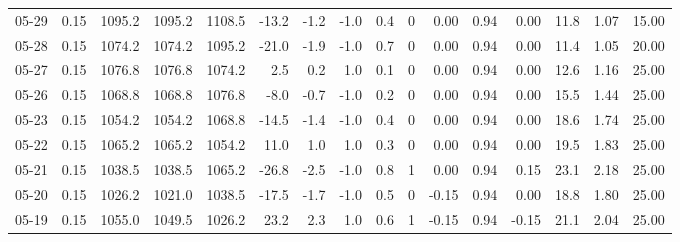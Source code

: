 \begin{threeparttable}
{\begin{tabular}{lrrrrrrrrrrrrrrr}
  05-29 &     0.15 & 1095.2 & 1095.2 & 1108.5 &      -13.2 &           -1.2 &                     -1.0 &                 0.4 &              0 &       0.00 &      0.94 &           0.00 &             11.8 &            1.07 &                  15.00 \\
  05-28 &     0.15 & 1074.2 & 1074.2 & 1095.2 &      -21.0 &           -1.9 &                     -1.0 &                 0.7 &              0 &       0.00 &      0.94 &           0.00 &             11.4 &            1.05 &                  20.00 \\
  05-27 &     0.15 & 1076.8 & 1076.8 & 1074.2 &        2.5 &            0.2 &                      1.0 &                 0.1 &              0 &       0.00 &      0.94 &           0.00 &             12.6 &            1.16 &                  25.00 \\
  05-26 &     0.15 & 1068.8 & 1068.8 & 1076.8 &       -8.0 &           -0.7 &                     -1.0 &                 0.2 &              0 &       0.00 &      0.94 &           0.00 &             15.5 &            1.44 &                  25.00 \\
  05-23 &     0.15 & 1054.2 & 1054.2 & 1068.8 &      -14.5 &           -1.4 &                     -1.0 &                 0.4 &              0 &       0.00 &      0.94 &           0.00 &             18.6 &            1.74 &                  25.00 \\
  05-22 &     0.15 & 1065.2 & 1065.2 & 1054.2 &       11.0 &            1.0 &                      1.0 &                 0.3 &              0 &       0.00 &      0.94 &           0.00 &             19.5 &            1.83 &                  25.00 \\
  05-21 &     0.15 & 1038.5 & 1038.5 & 1065.2 &      -26.8 &           -2.5 &                     -1.0 &                 0.8 &              1 &       0.00 &      0.94 &           0.15 &             23.1 &            2.18 &                  25.00 \\
  05-20 &     0.15 & 1026.2 & 1021.0 & 1038.5 &      -17.5 &           -1.7 &                     -1.0 &                 0.5 &              0 &      -0.15 &      0.94 &           0.00 &             18.8 &            1.80 &                  25.00 \\
  05-19 &     0.15 & 1055.0 & 1049.5 & 1026.2 &       23.2 &            2.3 &                      1.0 &                 0.6 &              1 &      -0.15 &      0.94 &          -0.15 &             21.1 &            2.04 &                  25.00 \\

\end{tabular}}
\end{threeparttable}
